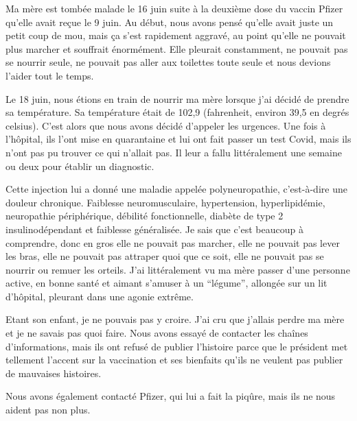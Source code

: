 Ma mère est tombée malade le 16 juin suite à la deuxième dose du vaccin Pfizer
qu'elle avait reçue le 9 juin. Au début, nous avons pensé qu'elle avait juste un
petit coup de mou, mais ça s'est rapidement aggravé, au point qu'elle ne pouvait
plus marcher et souffrait énormément. Elle pleurait constamment, ne pouvait pas
se nourrir seule, ne pouvait pas aller aux toilettes toute seule et nous devions
l'aider tout le temps.

Le 18 juin, nous étions en train de nourrir ma mère lorsque j'ai décidé de
prendre sa température. Sa température était de 102,9 (fahrenheit, environ 39,5
en degrés celsius). C'est alors que nous avons décidé d'appeler les
urgences. Une fois à l'hôpital, ils l'ont mise en quarantaine et lui ont fait
passer un test Covid, mais ils n'ont pas pu trouver ce qui n'allait pas. Il leur
a fallu littéralement une semaine ou deux pour établir un diagnostic.

Cette injection lui a donné une maladie appelée polyneuropathie, c'est-à-dire
une douleur chronique. Faiblesse neuromusculaire, hypertension, hyperlipidémie,
neuropathie périphérique, débilité fonctionnelle, diabète de type 2
insulinodépendant et faiblesse généralisée. Je sais que c'est beaucoup à
comprendre, donc en gros elle ne pouvait pas marcher, elle ne pouvait pas lever
les bras, elle ne pouvait pas attraper quoi que ce soit, elle ne pouvait pas se
nourrir ou remuer les orteils. J'ai littéralement vu ma mère passer d'une
personne active, en bonne santé et aimant s'amuser à un “légume”, allongée sur
un lit d'hôpital, pleurant dans une agonie extrême.

Etant son enfant, je ne pouvais pas y croire. J'ai cru que j'allais perdre ma
mère et je ne savais pas quoi faire. Nous avons essayé de contacter les chaînes
d'informations, mais ils ont refusé de publier l'histoire parce que le président
met tellement l'accent sur la vaccination et ses bienfaits qu'ils ne veulent pas
publier de mauvaises histoires.

Nous avons également contacté Pfizer, qui lui a fait la piqûre, mais ils ne nous
aident pas non plus.

